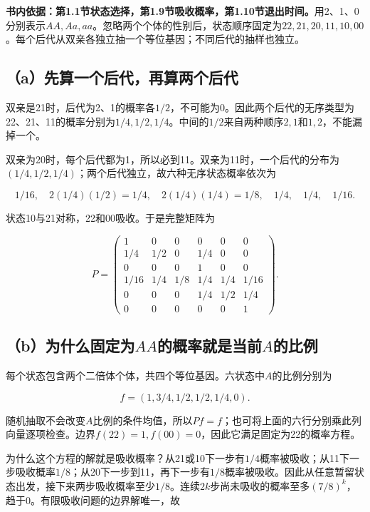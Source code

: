\documentclass[
  11pt,a4paper,UTF8,fontset=fandol]{ctexart}
\begin{document}
\textbf{书内依据：第1.1节状态选择，第1.9节吸收概率，第1.10节退出时间。}用2、1、0分别表示\(AA,Aa,aa\)。忽略两个个体的性别后，状态顺序固定为\(22,21,20,11,10,00\)。每个后代从双亲各独立抽一个等位基因；不同后代的抽样也独立。

\subsection{（a）先算一个后代，再算两个后代}\label{aux5148ux7b97ux4e00ux4e2aux540eux4ee3ux518dux7b97ux4e24ux4e2aux540eux4ee3}

双亲是21时，后代为2、1的概率各\(1/2\)，不可能为0。因此两个后代的无序类型为22、21、11的概率分别为\(1/4,1/2,1/4\)。中间的\(1/2\)来自两种顺序\(2,1\)和\(1,2\)，不能漏掉一个。

双亲为20时，每个后代都为1，所以必到11。双亲为11时，一个后代的分布为\((1/4,1/2,1/4)\)；两个后代独立，故六种无序状态概率依次为

\[1/16,\quad2(1/4)(1/2)=1/4,\quad2(1/4)(1/4)=1/8,\quad1/4,\quad1/4,\quad1/16.\]

状态10与21对称，22和00吸收。于是完整矩阵为

\[
\boxed{P=\begin{pmatrix}
1&0&0&0&0&0\\
1/4&1/2&0&1/4&0&0\\
0&0&0&1&0&0\\
1/16&1/4&1/8&1/4&1/4&1/16\\
0&0&0&1/4&1/2&1/4\\
0&0&0&0&0&1
\end{pmatrix}.}
\]

\subsection{\texorpdfstring{（b）为什么固定为\(AA\)的概率就是当前\(A\)的比例}{（b）为什么固定为AA的概率就是当前A的比例}}\label{bux4e3aux4ec0ux4e48ux56faux5b9aux4e3aaaux7684ux6982ux7387ux5c31ux662fux5f53ux524daux7684ux6bd4ux4f8b}

每个状态包含两个二倍体个体，共四个等位基因。六状态中\(A\)的比例分别为

\[f=(1,3/4,1/2,1/2,1/4,0).\]

随机抽取不会改变\(A\)比例的条件均值，所以\(Pf=f\)；也可将上面的六行分别乘此列向量逐项检查。边界\(f(22)=1,f(00)=0\)，因此它满足固定为22的概率方程。

为什么这个方程的解就是吸收概率？从21或10下一步有\(1/4\)概率被吸收；从11下一步吸收概率\(1/8\)；从20下一步到11，再下一步有\(1/8\)概率被吸收。因此从任意暂留状态出发，接下来两步吸收概率至少\(1/8\)。连续\(2k\)步尚未吸收的概率至多\((7/8)^k\)，趋于0。有限吸收问题的边界解唯一，故
\end{document}
